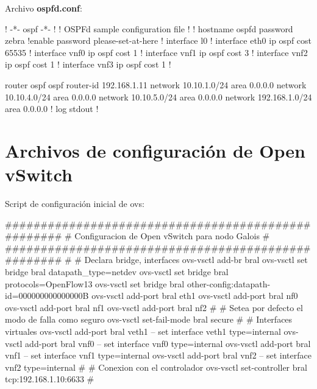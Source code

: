 \newpage
Archivo \textbf{ospfd.conf}:
\begin{bash}
! -*- ospf -*-
!
! OSPFd sample configuration file
!
!
hostname ospfd
password zebra
!enable password please-set-at-here
!
interface l0
!
interface eth0
  ip ospf cost 65535
!
interface vnf0
  ip ospf cost 1
!
interface vnf1
  ip ospf cost 3
!
interface vnf2
  ip ospf cost 1
!
interface vnf3
  ip ospf cost 1
!

router ospf
 ospf router-id 192.168.1.11
 network 10.10.1.0/24 area 0.0.0.0
 network 10.10.4.0/24 area 0.0.0.0
 network 10.10.5.0/24 area 0.0.0.0
 network 192.168.1.0/24 area 0.0.0.0
!
log stdout
!
\end{bash}

\newpage
\section{Archivos de configuraci\'on de Open vSwitch}

Script de configuraci\'on inicial de ovs:

\begin{bash}
###################################################
# Configuracion de Open vSwitch para nodo Galois  #
###################################################
#
# Declara bridge, interfaces
ovs-vsctl add-br bral
ovs-vsctl set bridge bral datapath_type=netdev
ovs-vsctl set bridge bral protocols=OpenFlow13
ovs-vsctl set bridge bral other-config:datapath-id=000000000000000B
ovs-vsctl add-port bral eth1
ovs-vsctl add-port bral nf0
ovs-vsctl add-port bral nf1
ovs-vsctl add-port bral nf2
#
# Setea por defecto el modo de falla como seguro
ovs-vsctl set-fail-mode bral secure
#
# Interfaces virtuales
ovs-vsctl add-port bral veth1 
-- set interface veth1 type=internal
ovs-vsctl add-port bral vnf0 
-- set interface vnf0 type=internal
ovs-vsctl add-port bral vnf1 
-- set interface vnf1 type=internal
ovs-vsctl add-port bral vnf2 
-- set interface vnf2 type=internal
#
# Conexion con el controlador
ovs-vsctl set-controller bral tcp:192.168.1.10:6633
#
\end{bash}


